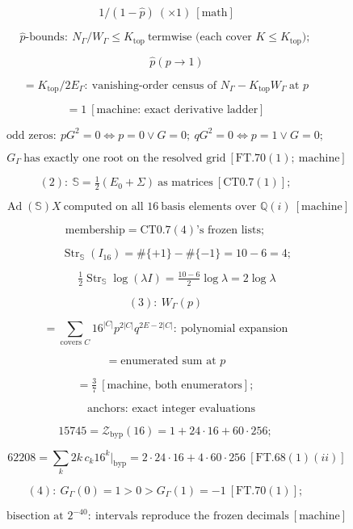 \begin{theorem}
\[
\ 1/(1-\hat p)\ (\times1)\ [\text{math}]
\]

\[
\hat p\text{-bounds}:\ N_\Gamma/W_\Gamma\le K_{\mathrm{top}}\ \text{termwise (each cover }K\le K_{\mathrm{top}});
\]

\[
\qquad \hat p(p\to1)
\]

\[
= K_{\mathrm{top}}/2E_\Gamma:\ \text{vanishing-order census of }N_\Gamma-K_{\mathrm{top}}W_\Gamma\ \text{at }p
\]

\[
= 1\ [\text{machine: exact derivative ladder}]
\]

\[
\text{odd zeros}:\ pG^2=0\iff p=0\vee G=0;\ qG^2=0\iff p=1\vee G=0;
\]

\[
\qquad G_\Gamma\ \text{has exactly one root on the resolved grid}\ [\mathrm{FT.70}(1);\ \text{machine}]
\]

\[
(2):\ \mathbb S=\tfrac12(E_0+\Sigma)\ \text{as matrices}\ [\mathrm{CT0.7}(1)];
\]

\[
\qquad \operatorname{Ad}(\mathbb S)X\ \text{computed on all }16\ \text{basis elements over }\mathbb Q(i)\ [\text{machine}]
\]

\[
\text{membership}=\mathrm{CT0.7}(4)\text{'s frozen lists};
\]

\[
\qquad \operatorname{Str}_{\mathbb S}(I_{16})=\#\{+1\}-\#\{-1\}=10-6=4;
\]

\[
\qquad \tfrac12\operatorname{Str}_{\mathbb S}\log(\lambda I)=\tfrac{10-6}2\log\lambda=2\log\lambda
\]

\[
(3):\ W_\Gamma(p)
\]

\[
= \sum_{\text{covers }C}16^{|C|}p^{2|C|}q^{2E-2|C|}:\ \text{polynomial expansion}
\]

\[
= \text{enumerated sum at }p
\]

\[
= \tfrac37\ [\text{machine, both enumerators}];
\]

\[
\quad \text{anchors: exact integer evaluations}
\]

\[
15745=\mathcal Z_{\mathrm{byp}}(16)=1+24\cdot16+60\cdot256;
\]

\[
\qquad 62208=\sum_k2k\,c_k16^k\big|_{\mathrm{byp}}=2\cdot24\cdot16+4\cdot60\cdot256\ [\mathrm{FT.68}(1)(ii)]
\]

\[
(4):\ G_\Gamma(0)=1>0>G_\Gamma(1)=-1\ [\mathrm{FT.70}(1)];
\]

\[
\qquad \text{bisection at }2^{-40}:\ \text{intervals reproduce the frozen decimals}\ [\text{machine}]
\]


\end{theorem}
